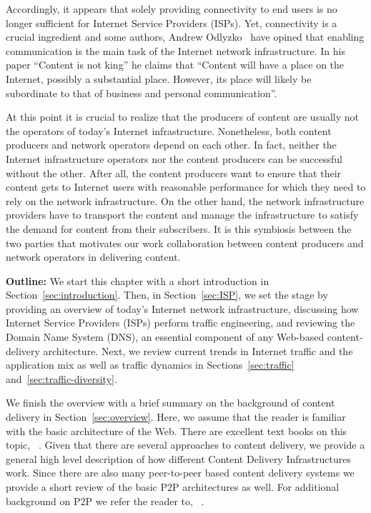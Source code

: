 Accordingly, it appears that solely providing connectivity to end users is no
longer sufficient for Internet Service Providers (ISPs).  Yet, connectivity is
a crucial ingredient and some authors, \eg Andrew
Odlyzko~\cite{odlyzko2001content} have opined that enabling communication is
the main task of the Internet network infrastructure. In his paper ``Content is
not king'' he claims that ``Content will have a place on the Internet, possibly
a substantial place. However, its place will likely be subordinate to that of
business and personal communication''.

At this point it is crucial to realize that the producers of content are
usually not the operators of today's Internet infrastructure. Nonetheless, both
content producers and network operators depend on each other. In fact, neither
the Internet infrastructure operators nor the content producers can be
successful without the other.  After all, the content producers want to ensure
that their content gets to Internet users with reasonable performance for which
they need to rely on the network infrastructure.  On the other hand, the
network infrastructure providers have to transport the content and manage the
infrastructure to satisfy the demand for content from their subscribers. It is
this symbiosis between the two parties that motivates our work collaboration
between content producers and network operators in delivering content.

\bigskip 

\noindent\textbf{Outline:} We start this chapter with a short introduction in
Section~\ref{sec:introduction}.  Then, in Section~\ref{sec:ISP}, we set the
stage by providing an overview of today's Internet network infrastructure,
discussing how Internet Service Providers (ISPs) perform traffic engineering,
and reviewing the Domain Name System (DNS), an essential component of any
Web-based content-delivery architecture.   Next, we review current trends in
Internet traffic and the application mix as well as traffic dynamics in
Sections~\ref{sec:traffic} and~\ref{sec:traffic-diversity}.

We finish the overview with a brief summary on the background of content
delivery in Section~\ref{sec:overview}. Here, we assume that the reader is
familiar with the basic architecture of the Web. There are excellent text books
on this topic, \eg~\cite{web-book}.  Given that there are several approaches to
content delivery, we provide a general high level description of how different
Content Delivery Infrastructures work.  Since there are also many peer-to-peer
based content delivery systems we provide a short review of the basic P2P
architectures as well. For additional background on P2P we refer the reader to,
\eg~\cite{p2pbook1,p2pbook2}.

